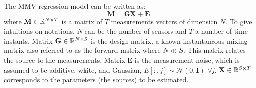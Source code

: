 The MMV regression model can be written as: 
\begin{equation} \label{eq1}
    \mathbf{M} = \mathbf{GX + E}
\end{equation}
where $\mathbf{M}\in\mathbb{R}^{N\times T}$ is a matrix of $T$ measurements vectors of dimension $N$. %
To give intuitions on notations, $N$ can be the number of sensors and $T$ a number of time instants. Matrix $\mathbf{G}\in\mathbb{R}^{N\times S}$ is the design matrix, a known instantaneous mixing matrix also referred to as the forward matrix where $N \ll S$. This matrix relates the source to the measurements. Matrix $\mathbf{E}$ is the measurement noise, which is assumed to be additive, white, and Gaussian, $E[:, j] \sim \mathcal{N}(0, \mathbf{I})$ $\forall j$.  $\mathbf{X}\in\mathbb{R}^{S\times T}$ corresponds to the parameters (the sources) to be estimated.


